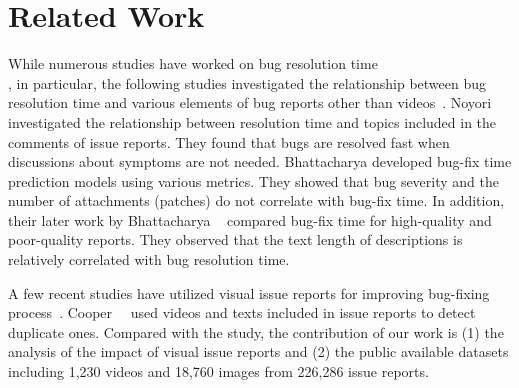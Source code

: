 \section{Related Work}
\label{sec:relate}
While numerous studies have worked on bug resolution time~\citep{DBLP:conf/msr/ChenNSH14}\citep{DBLP:journals/jss/GarciaSN18}\citep{DBLP:conf/sigsoft/JeongKZ09}\\
\citep{DBLP:conf/icsm/KashiwaYKO14}\citep{DBLP:conf/msr/ZamanAH11}, 
in particular, the following studies investigated the relationship between bug resolution time and various elements of bug reports other than videos~\citep{DBLP:conf/msr/BhattacharyaN11}\citep{DBLP:conf/csmr/BhattacharyaUNK13}\citep{DBLP:journals/ieicetd/NoyoriWFKONT21}. 
Noyori~\et~\citep{DBLP:journals/ieicetd/NoyoriWFKONT21} investigated the relationship between resolution time and topics included in the comments of issue reports. 
They found that bugs are resolved fast when discussions about symptoms are not needed.  Bhattacharya \et \citep{DBLP:conf/msr/BhattacharyaN11} developed bug-fix
time prediction models using various metrics. They showed that bug severity and the number of attachments (patches) do not correlate with bug-fix time. In addition, their later work by Bhattacharya \et~\citep{DBLP:conf/csmr/BhattacharyaUNK13} compared bug-fix time for high-quality and poor-quality reports. They observed that the text length of descriptions is relatively correlated with bug resolution time. 

A few recent studies have utilized visual issue reports for improving bug-fixing process~\citep{DBLP:conf/icse/CooperBCMP21}. Cooper~\et~\citep{DBLP:conf/icse/CooperBCMP21} used videos and texts included in issue reports to detect duplicate ones. Compared with the study, the contribution of our work is (1) the analysis of the impact of visual issue reports and (2) the public available datasets including 1,230 videos and 18,760 images from 226,286 issue reports.
